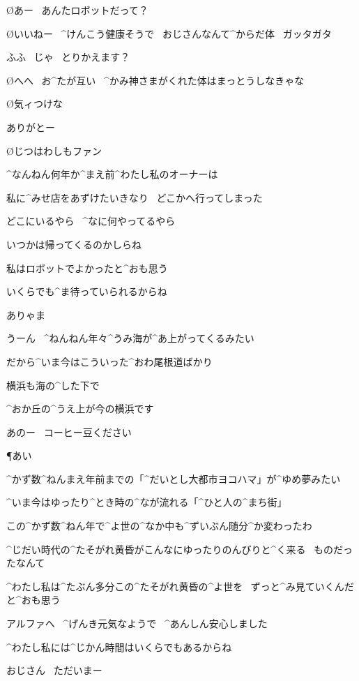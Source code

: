 \O あー
\ あんたロボットだって？

\O いいねー
\ ^{けんこう}{健康}そうで
\ おじさんなんて^{からだ}{体}
\ ガッタガタ

\A ふふ
\ じゃ
\ とりかえます？

\page
\O へへ
\ お^{たが}{互}い
\ ^{かみ}{神}さまがくれた体はまっとうしなきゃな

\O 気ィつけな

\A ありがとー

\O じつはわしもファン

\page
\A ^{なんねん}{何年}か^{まえ}{前}^{わたし}{私}のオーナーは

\A 私に^{みせ}{店}をあずけたいきなり
\ どこかへ行ってしまった

\A どこにいるやら
\ ^{なに}{何}やってるやら

\A いつかは帰ってくるのかしらね

\A 私はロボットでよかったと^{おも}{思}う

\A いくらでも^{ま}{待}っていられるからね

\page[18]
\A ありゃま

\A うーん
\ ^{ねんねん}{年々}^{うみ}{海}が^{あ}{上}がってくるみたい

\page
\A だから^{いま}{今}はこういった^{おわ}{尾根}道ばかり

\page
\A 横浜も海の^{した}{下}で

\A ^{おか}{丘}の^{うえ}{上}が今の横浜です

\page[22]
\A あのー
\ コーヒー豆ください

\P あい

\A ^{かず}{数}^{ねんまえ}{年前}までの「^{だいとし}{大都市}ヨコハマ」が^{ゆめ}{夢}みたい

\A ^{いま}{今}はゆったり^{とき}{時}の^{なが}{流}れる「^{ひと}{人}の^{まち}{街}」

\page
\A この^{かず}{数}^{ねん}{年}で^{よ}{世}の^{なか}{中}も^{ずいぶん}{随分}^{か}{変}わったわ

\A ^{じだい}{時代}の^{たそがれ}{黄昏}がこんなにゆったりのんびりと^{く}{来}る
\ ものだったなんて

\A ^{わたし}{私}は^{たぶん}{多分}この^{たそがれ}{黄昏}の^{よ}{世}を
\ ずっと^{み}{見}ていくんだと^{おも}{思}う

\page
\Sign アルファへ
\ ^{げんき}{元気}なようで
\ ^{あんしん}{安心}しました

\A ^{わたし}{私}には^{じかん}{時間}はいくらでもあるからね

\A おじさん
\ ただいまー

